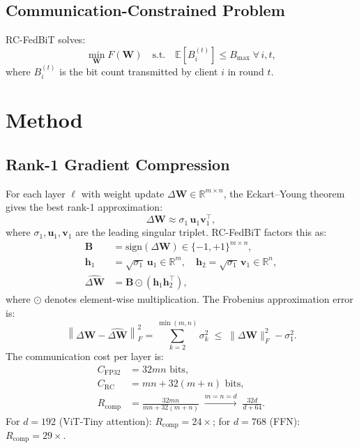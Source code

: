 \documentclass[conference]{IEEEtran}
\begin{document}
\subsection{Communication-Constrained Problem}

RC-FedBiT solves:
\begin{equation}
    \min_{\mathbf{W}} F(\mathbf{W}) \quad \text{s.t.} \quad \mathbb{E}\!\left[B_i^{(t)}\right] \leq B_{\max} \;\forall\, i, t,
\end{equation}
where $B_i^{(t)}$ is the bit count transmitted by client $i$ in round $t$.

\section{Method}

\subsection{Rank-1 Gradient Compression}

For each layer $\ell$ with weight update $\Delta\mathbf{W} \in \mathbb{R}^{m\times n}$, the Eckart–Young theorem gives the best rank-1 approximation:
\begin{equation}
    \Delta\mathbf{W} \approx \sigma_1\, \mathbf{u}_1 \mathbf{v}_1^\top,
\end{equation}
where $\sigma_1, \mathbf{u}_1, \mathbf{v}_1$ are the leading singular triplet. RC-FedBiT factors this as:
\begin{align}
    \mathbf{B} &= \mathrm{sign}(\Delta\mathbf{W}) \in \{-1,+1\}^{m\times n}, \\
    \mathbf{h}_1 &= \sqrt{\sigma_1}\,\mathbf{u}_1 \in \mathbb{R}^m, \quad \mathbf{h}_2 = \sqrt{\sigma_1}\,\mathbf{v}_1 \in \mathbb{R}^n, \\
    \widehat{\Delta\mathbf{W}} &= \mathbf{B} \odot \left(\mathbf{h}_1 \mathbf{h}_2^\top\right), \label{eq:recon}
\end{align}
where $\odot$ denotes element-wise multiplication. The Frobenius approximation error is:
\begin{equation}
    \left\|\Delta\mathbf{W} - \widehat{\Delta\mathbf{W}}\right\|_F^2 = \sum_{k=2}^{\min(m,n)} \sigma_k^2 \;\leq\; \|\Delta\mathbf{W}\|_F^2 - \sigma_1^2.
\end{equation}
The communication cost per layer is:
\begin{align}
    C_{\mathrm{FP32}} &= 32mn \text{ bits}, \\
    C_{\mathrm{RC}} &= mn + 32(m+n) \text{ bits}, \\
    R_{\mathrm{comp}} &= \frac{32mn}{mn + 32(m+n)} \;\xrightarrow{m=n=d}\; \frac{32d}{d+64}.
\end{align}
For $d = 192$ (ViT-Tiny attention): $R_{\mathrm{comp}} = 24\times$; for $d = 768$ (FFN): $R_{\mathrm{comp}} = 29\times$.
\end{document}
